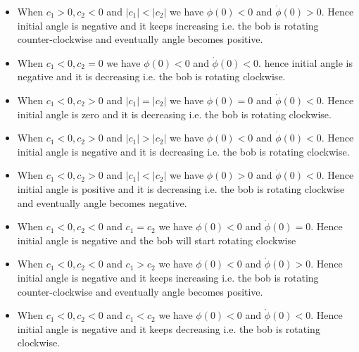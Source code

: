\documentclass{article}
\begin{document}
\begin{enumerate}
\begin{enumerate}
\begin{itemize}
			\item When $c_1>0, c_2<0$ and $|c_1|< |c_2|$ we have $\phi(0)<0$ and $\dot{\phi}(0)> 0$. Hence initial angle is negative and it keeps increasing i.e. the bob is rotating counter-clockwise  and eventually angle becomes positive.
			\item When $c_1<0,c_2=0$ we have $\phi(0)<0$ and $\dot{\phi}(0)<0$. hence initial angle is negative and it is decreasing i.e. the bob is rotating clockwise.
			\item When $c_1<0,c_2>0$ and $|c_1|=|c_2|$ we have $\phi(0)=0$ and $\dot{\phi}(0)<0$. Hence initial angle is zero and it is decreasing i.e. the bob is rotating clockwise.
			\item When $c_1<0,c_2>0$ and $|c_1|>|c_2|$ we have $\phi(0)<0$ and $\dot{\phi}(0)<0$. Hence initial angle is negative and it is decreasing i.e. the bob is rotating clockwise.
			\item When $c_1<0, c_2> 0$ and $|c_1|< |c_2|$ we have $\phi(0)> 0$ and $\dot{\phi}(0)<0$. Hence initial angle is positive and it is  decreasing i.e. the bob  is rotating clockwise and eventually angle becomes negative.
			\item When $c_1<0, c_2< 0$ and $c_1=c_2$ we have $\phi(0)<0$ and $\dot{\phi}(0)= 0$. Hence initial angle is negative and the bob will start rotating  clockwise
			\item When $c_1<0, c_2< 0$ and $c_1>c_2$ we have $\phi(0)<0$ and $\dot{\phi}(0)>0$. Hence initial angle is negative and it keeps increasing i.e. the bob is rotating counter-clockwise  and eventually angle becomes positive.
			\item When $c_1<0, c_2< 0$ and $c_1<c_2$ we have $\phi(0)<0$ and $\dot{\phi}(0)< 0$. Hence initial angle is negative and it keeps decreasing i.e. the bob is rotating clockwise.
		

\end{itemize}
\end{enumerate}
\end{enumerate}
\end{document}
